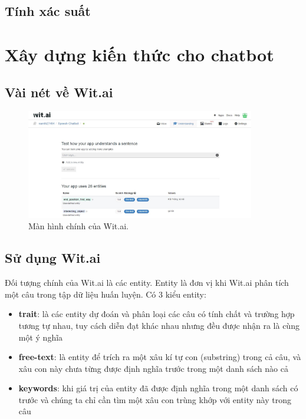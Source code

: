 \documentclass[12pt]{report}
\begin{document}
\subsection{Tính xác suất}



\section{Xây dựng kiến thức cho chatbot}

\subsection{Vài nét về Wit.ai}

\begin{figure}[H] \label{fig:mainboard-wit}
	\centering
	\includegraphics[width=10cm]{Pics/Chap6/wit-mainboard.JPG}
	\caption{Màn hình chính của Wit.ai.}
\end{figure}

\subsection{Sử dụng Wit.ai}

Đối tượng chính của Wit.ai là các entity. Entity là đơn vị khi Wit.ai phân tích một câu trong tập dữ liệu huấn luyện. Có 3 kiểu entity:

\begin{itemize}
	\item \textbf{trait}: là các entity dự đoán và phân loại các câu có tính chất và trường hợp tương tự nhau, tuy cách diễn đạt khác nhau nhưng đều được nhận ra là cùng một ý nghĩa
	\item \textbf{free-text}: là entity để trích ra một xâu kí tự con (substring) trong cả câu, và xâu con này chưa từng được định nghĩa trước trong một danh sách nào cả
	\item \textbf{keywords}: khi giá trị của entity đã được định nghĩa trong một danh sách có trước và chúng ta chỉ cần tìm một xâu con trùng khớp với entity này trong câu
\end{itemize}
\end{document}
